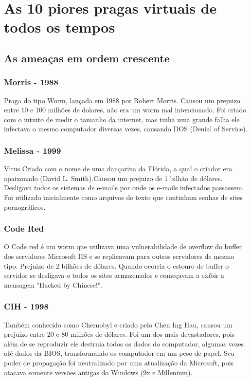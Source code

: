 \chapter{As 10 piores pragas virtuais de todos os tempos}
\section {As ameaças em ordem crescente}
\subsection{Morris - 1988}

	Praga do tipo Worm, lançada em 1988 por Robert Morris. Causou um prejuizo entre 10 e 100 milhões de dolares, não era um worm mal intencionado. Foi criado com o intuito de medir o tamanho da internet, mas tinha uma grande falha ele infectava o mesmo computador diversas vezes, causando DOS (Denial of Service).

\subsection{Melissa - 1999}
	Virus Criado com o nome de uma dançarina da Flórida, a qual o criador era apaixonado (David L. Smith).Causou um prejuizo de 1 bilhão de dólares. Desligava todos os sistemas de e-mails por onde os e-mails infectados passassem. Foi utilizado inicialmente como arquivos de texto que continham senhas de sites pornográficos.

\subsection{Code Red}

	O Code red é um worm que utilizava uma vulnerabilidade de overflow do buffer dos servidores Microsoft IIS e se replicavam para outros servidores de mesmo tipo. Prejuizo de 2 bilhões de dólares. Quando ocorria o estouro de buffer o servidor se desligava o todos os sites armazenados e começavam a exibir a mensagem "Hacked by Chinese!".

\subsection{CIH - 1998}

	Também conhecido como Chernobyl e criado pelo Chen Ing Hau, causou um prejuizo entre 20 e 80 milhões de dólares. Foi um dos mais devastadores, pois além de se reproduzir ele destruia todos os dados do computador, algumas vezes até dados da BIOS, transformando os computador em um peso de papel. Seu poder de propagação foi neutralizado por uma atualização da Microsoft, pois atacava somente versões antigas do Windows (9x e Millenium).

